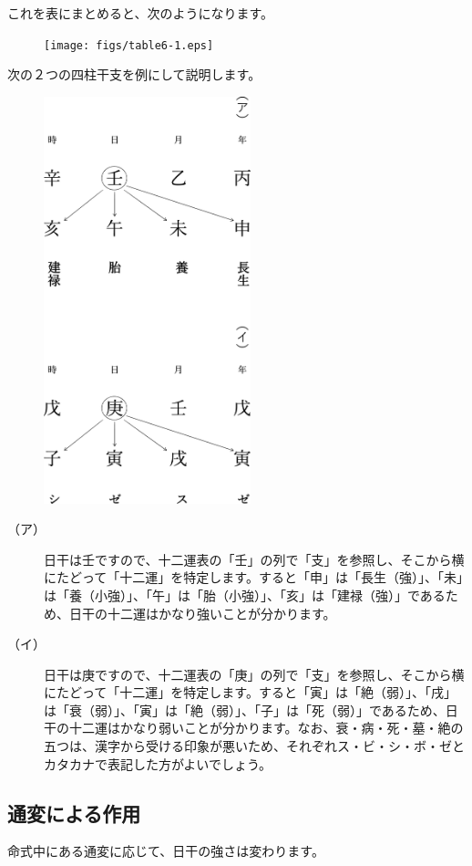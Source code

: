 \documentclass[a5paper,11pt,dvipdfmx]{tarticle}
\begin{document}
これを表にまとめると、次のようになります。

\begin{figure}[h]
 \texttt{[image: figs/table6-1.eps]}
\end{figure}

次の２つの四柱干支を例にして説明します。

\begin{figure}[h]
  \includegraphics[width=60mm,angle=90]{figs/figure6-4.eps}
\end{figure}

\begin{description}
 \item[（ア）] 日干は壬ですので、十二運表の「壬」の列で「支」を参照し、そこから横にたどって「十二運」を特定します。すると「申」は「長生（強）」、「未」は「養（小強）」、「午」は「胎（小強）」、「亥」は「建禄（強）」であるため、日干の十二運はかなり強いことが分かります。
 \item[（イ）] 日干は庚ですので、十二運表の「庚」の列で「支」を参照し、そこから横にたどって「十二運」を特定します。すると「寅」は「絶（弱）」、「戌」は「衰（弱）」、「寅」は「絶（弱）」、「子」は「死（弱）」であるため、日干の十二運はかなり弱いことが分かります。なお、衰・病・死・墓・絶の五つは、漢字から受ける印象が悪いため、それぞれス・ビ・シ・ボ・ゼとカタカナで表記した方がよいでしょう。
\end{description}

\subsection{通変による作用}
命式中にある通変に応じて、日干の強さは変わります。
\end{document}
